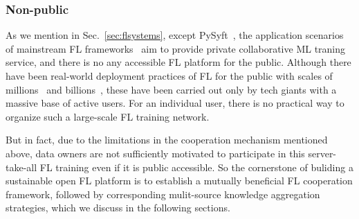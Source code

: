 \subsubsection{Non-public} %
As we mention in Sec.~\ref{sec:flsystems}, except PySyft~\cite{ziller2021pysyft}, the application scenarios of mainstream FL frameworks~\cite{liu2021fate, abadi2016tensorflow, zeng2021fedlab, caldas2018leaf, ibmfl2020ibm, he2020fedml, beutel2020flower, roth2022nvidia} aim to provide private collaborative ML traning service, and there is no any accessible FL platform for the public.
Although there have been real-world deployment practices of FL for the public with scales of millions~\cite{bonawitz2019towards} and billions~\cite{niu2020billion}, these have been carried out only by tech giants with a massive base of active users. For an individual user, there is no practical way to organize such a large-scale FL training network.

But in fact, due to the limitations in the cooperation mechanism mentioned above, data owners are not sufficiently motivated to participate in this server-take-all FL training even if it is public accessible. So the cornerstone of buliding a sustainable open FL platform is to establish a mutually beneficial FL cooperation framework, followed by corresponding mulit-source knowledge aggregation strategies, which we discuss in the following sections.